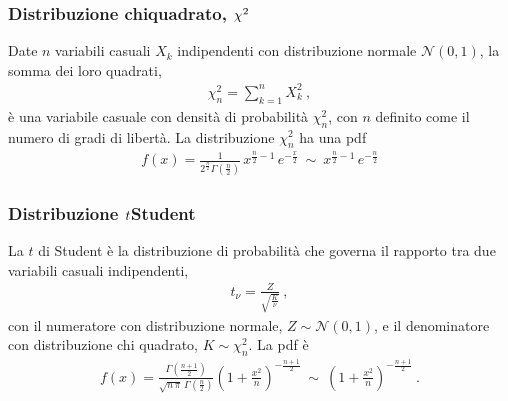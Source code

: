 \documentclass[letterpaper,10pt,italian]{jupyterBook}
\begin{document}
\subsubsection{Distribuzione chi\sphinxhyphen{}quadrato, \protect\(\chi^2\protect\)}
\label{\detokenize{ch/statistics/pfun_continuous_examples:distribuzione-chi-quadrato-chi-2}}
\sphinxAtStartPar
Date \(n\) variabili casuali \(X_k\) indipendenti con distribuzione normale \(\mathscr{N}(0,1)\), la somma dei loro quadrati,
\begin{equation*}
\begin{split}\chi_n^2 = \sum_{k=1}^{n} X^2_k \ ,\end{split}
\end{equation*}
\sphinxAtStartPar
è una variabile casuale con densità di probabilità \(\chi^2_n\), con \(n\) definito come il numero di gradi di libertà. La distribuzione \(\chi^2_n\) ha una pdf
\begin{equation*}
\begin{split}f(x) = \frac{1}{2^{\frac{n}{2}} \Gamma\left(\frac{n}{2}\right)} \, x^{\frac{n}{2}-1} \, e^{-\frac{x}{2}} \ \sim \ x^{\frac{n}{2}-1} \, e^{-\frac{n}{2}}\end{split}
\end{equation*}

\subsubsection{Distribuzione \protect\(t\protect\)\sphinxhyphen{}Student}
\label{\detokenize{ch/statistics/pfun_continuous_examples:distribuzione-t-student}}
\sphinxAtStartPar
La \(t\) di Student è la distribuzione di probabilità che governa il rapporto tra due variabili casuali indipendenti,
\begin{equation*}
\begin{split}t_{\nu} = \frac{Z}{\sqrt{\frac{K}{\nu}}} \ ,\end{split}
\end{equation*}
\sphinxAtStartPar
con il numeratore con distribuzione normale, \(Z \sim \mathscr{N}(0,1)\), e il denominatore con distribuzione chi quadrato, \(K \sim \chi^2_n\). La pdf è
\begin{equation*}
\begin{split}f(x) = \frac{\Gamma\left(\frac{n+1}{2}\right)}{\sqrt{n \, \pi} \, \Gamma\left(\frac{n}{2}\right)} \left( 1 + \frac{x^2}{n} \right)^{-\frac{n + 1}{2}} \ \sim \ \left( 1 + \frac{x^2}{n} \right)^{-\frac{n + 1}{2}} \ .\end{split}
\end{equation*}
\end{document}
